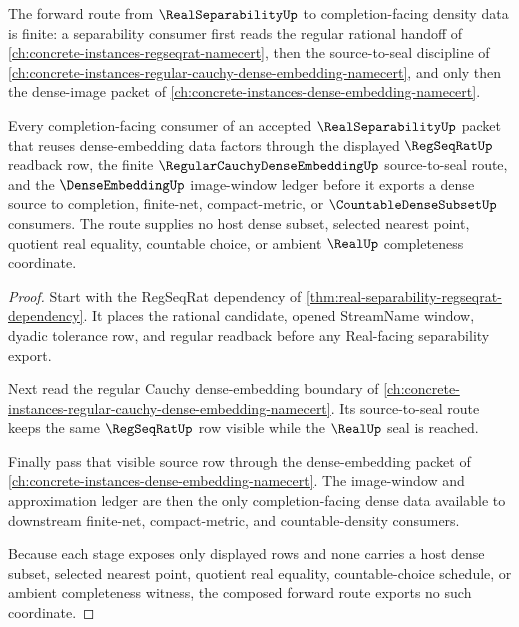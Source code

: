 The forward route from $\RealSeparabilityUp$ to completion-facing density data is finite: a separability consumer first reads the regular rational handoff of \autoref{ch:concrete-instances-regseqrat-namecert}, then the source-to-seal discipline of \autoref{ch:concrete-instances-regular-cauchy-dense-embedding-namecert}, and only then the dense-image packet of \autoref{ch:concrete-instances-dense-embedding-namecert}.

\begin{theorem}
\label{thm:real-separability-regseqrat-forward-route}
Every completion-facing consumer of an accepted $\RealSeparabilityUp$ packet that reuses dense-embedding data factors through the displayed $\RegSeqRatUp$ readback row, the finite $\RegularCauchyDenseEmbeddingUp$ source-to-seal route, and the $\DenseEmbeddingUp$ image-window ledger before it exports a dense source to completion, finite-net, compact-metric, or $\CountableDenseSubsetUp$ consumers. The route supplies no host dense subset, selected nearest point, quotient real equality, countable choice, or ambient $\RealUp$ completeness coordinate.
\end{theorem}
\begin{proof}
Start with the RegSeqRat dependency of \autoref{thm:real-separability-regseqrat-dependency}. It places the rational candidate, opened StreamName window, dyadic tolerance row, and regular readback before any Real-facing separability export.

Next read the regular Cauchy dense-embedding boundary of \autoref{ch:concrete-instances-regular-cauchy-dense-embedding-namecert}. Its source-to-seal route keeps the same $\RegSeqRatUp$ row visible while the $\RealUp$ seal is reached.

Finally pass that visible source row through the dense-embedding packet of \autoref{ch:concrete-instances-dense-embedding-namecert}. The image-window and approximation ledger are then the only completion-facing dense data available to downstream finite-net, compact-metric, and countable-density consumers.

Because each stage exposes only displayed rows and none carries a host dense subset, selected nearest point, quotient real equality, countable-choice schedule, or ambient completeness witness, the composed forward route exports no such coordinate.
\end{proof}


